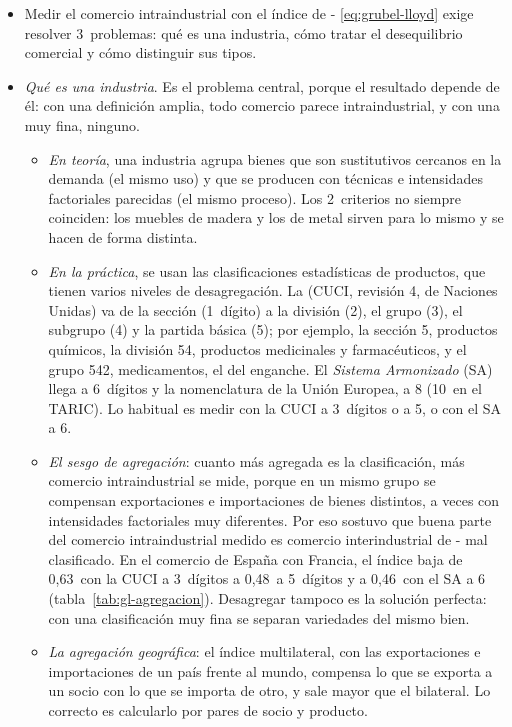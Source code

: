 \documentclass[11pt]{article}
\begin{document}
\begin{itemize}
\item Medir el comercio intraindustrial con el índice de - \eqref{eq:grubel-lloyd} exige resolver 3~problemas: qué es una industria, cómo tratar el desequilibrio comercial y cómo distinguir sus tipos.
\item \emph{Qué es una industria}. Es el problema central, porque el resultado depende de él: con una definición amplia, todo comercio parece intraindustrial, y con una muy fina, ninguno.
  \begin{itemize}
  \item \emph{En teoría}, una industria agrupa bienes que son sustitutivos cercanos en la demanda (el mismo uso) y que se producen con técnicas e intensidades factoriales parecidas (el mismo proceso). Los 2~criterios no siempre coinciden: los muebles de madera y los de metal sirven para lo mismo y se hacen de forma distinta.
  \item \emph{En la práctica}, se usan las clasificaciones estadísticas de productos, que tienen varios niveles de desagregación. La  (CUCI, revisión 4, de Naciones Unidas) va de la sección (1~dígito) a la división (2), el grupo (3), el subgrupo (4) y la partida básica (5); por ejemplo, la sección 5, productos químicos, la división 54, productos medicinales y farmacéuticos, y el grupo 542, medicamentos, el del enganche. El \emph{Sistema Armonizado} (SA) llega a 6~dígitos y la nomenclatura de la Unión Europea, a 8 (10~en el TARIC). Lo habitual es medir con la CUCI a 3~dígitos o a 5, o con el SA a 6.
  \item \emph{El sesgo de agregación}: cuanto más agregada es la clasificación, más comercio intraindustrial se mide, porque en un mismo grupo se compensan exportaciones e importaciones de bienes distintos, a veces con intensidades factoriales muy diferentes. Por eso \textcite{Finger1975Trade} sostuvo que buena parte del comercio intraindustrial medido es comercio interindustrial de - mal clasificado. En el comercio de España con Francia, el índice baja de 0,63~con la CUCI a 3~dígitos a 0,48~a 5~dígitos y a 0,46~con el SA a 6 (tabla~\ref{tab:gl-agregacion}). Desagregar tampoco es la solución perfecta: con una clasificación muy fina se separan variedades del mismo bien.
  \item \emph{La agregación geográfica}: el índice multilateral, con las exportaciones e importaciones de un país frente al mundo, compensa lo que se exporta a un socio con lo que se importa de otro, y sale mayor que el bilateral. Lo correcto es calcularlo por pares de socio y producto.

\end{itemize}
\end{itemize}
\end{document}
